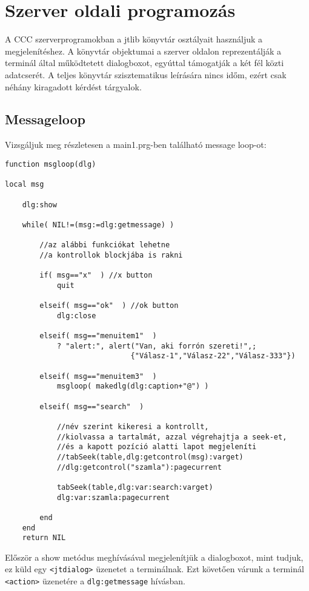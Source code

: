 
\section{Szerver oldali programozás} 
 
A CCC szerverprogramokban a jtlib könyvtár osztályait használjuk 
a megjelenítéshez. A könyvtár objektumai a szerver oldalon reprezentálják 
a terminál által működtetett dialogboxot, egyúttal támogatják a két fél 
közti adatcserét. A teljes könyvtár szisztematikus leírására nincs időm, 
ezért csak néhány kiragadott kérdést tárgyalok.

\subsection{Messageloop}

Vizsgáljuk meg részletesen a main1.prg-ben található message loop-ot:

\begin{verbatim}
function msgloop(dlg)

local msg

    dlg:show  
 
    while( NIL!=(msg:=dlg:getmessage) ) 
    
        //az alábbi funkciókat lehetne
        //a kontrollok blockjába is rakni
        
        if( msg=="x"  ) //x button
            quit
 
        elseif( msg=="ok"  ) //ok button
            dlg:close

        elseif( msg=="menuitem1"  ) 
            ? "alert:", alert("Van, aki forrón szereti!",;
                             {"Válasz-1","Válasz-22","Válasz-333"})

        elseif( msg=="menuitem3"  ) 
            msgloop( makedlg(dlg:caption+"@") )

        elseif( msg=="search"  ) 

            //név szerint kikeresi a kontrollt,
            //kiolvassa a tartalmát, azzal végrehajtja a seek-et,
            //és a kapott pozíció alatti lapot megjeleníti
            //tabSeek(table,dlg:getcontrol(msg):varget)
            //dlg:getcontrol("szamla"):pagecurrent 
            
            tabSeek(table,dlg:var:search:varget)
            dlg:var:szamla:pagecurrent
 
        end
    end
    return NIL
\end{verbatim}

Először a show metódus meghívásával megjelenítjük a dialogboxot,
mint tudjuk, ez küld egy \verb!<jtdialog>! üzenetet a terminálnak. 
Ezt követően várunk a terminál \verb!<action>! üzenetére a 
\verb!dlg:getmessage! hívásban.

